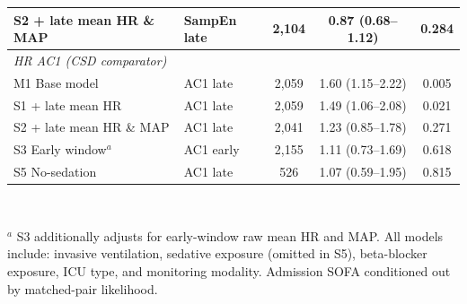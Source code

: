 \documentclass[12pt,a4paper]{article}
\begin{document}
\begin{table}[htbp]
\begin{tabular}{llccc}
    S2 + late mean HR \& MAP & SampEn late  & 2{,}104 & 0.87 (0.68--1.12) & 0.284 \\
    \midrule
    \multicolumn{5}{l}{\textit{HR AC1 (CSD comparator)}} \\
    M1 Base model            & AC1 late  & 2{,}059 & 1.60 (1.15--2.22) & 0.005 \\
    S1 + late mean HR        & AC1 late  & 2{,}059 & 1.49 (1.06--2.08) & 0.021 \\
    S2 + late mean HR \& MAP & AC1 late  & 2{,}041 & 1.23 (0.85--1.78) & 0.271 \\
    S3 Early window$^a$      & AC1 early & 2{,}155 & 1.11 (0.73--1.69) & 0.618 \\
    S5 No-sedation           & AC1 late  &   526 & 1.07 (0.59--1.95) & 0.815 \\
    \bottomrule
  \end{tabular}
  \vspace{2pt}\\
  \raggedright\footnotesize
  $^a$ S3 additionally adjusts for early-window raw mean HR and MAP.
  All models include: invasive ventilation, sedative exposure (omitted in S5),
  beta-blocker exposure, ICU type, and monitoring modality.
  Admission SOFA conditioned out by matched-pair likelihood.
\end{table}

\clearpage
\end{document}

